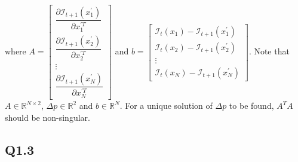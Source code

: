 \documentclass{article} %
\begin{document}
    where $A=\left[\begin{array}{c}
    \dfrac{\partial \mathcal{I}_{t+1}\left({x}_{1}^{'}\right)}{\partial {x}_{1}^{'T}}\\
    \dfrac{\partial \mathcal{I}_{t+1}\left({x}_{2}^{'}\right)}{\partial {x}_{2}^{'T}}\\
    \vdots \\
    \dfrac{\partial \mathcal{I}_{t+1}\left({x}_{N}^{'}\right)}{\partial {x}_{N}^{'T}}
    \end{array}\right]$ and $b=\left[\begin{array}{c}
    \mathcal{I}_{t}\left(x_{1}\right)-\mathcal{I}_{t+1}\left({x}_{1}^{'}\right)\\
    \mathcal{I}_{t}\left(x_{2}\right)-\mathcal{I}_{t+1}\left({x}_{2}^{'}\right)\\
    \vdots \\
    \mathcal{I}_{t}\left(x_{N}\right)-\mathcal{I}_{t+1}\left({x}_{N}^{'}\right)
    \end{array}\right]$. Note that $A\in \mathbb{R}^{N\times 2}$, $\Delta p\in \mathbb{R}^{2}$ and $b\in \mathbb{R}^{N}$. For a unique solution of $\Delta p$ to be found, $A^{T}A$ should be non-singular.

    \subsection*{Q1.3}
\end{document}
